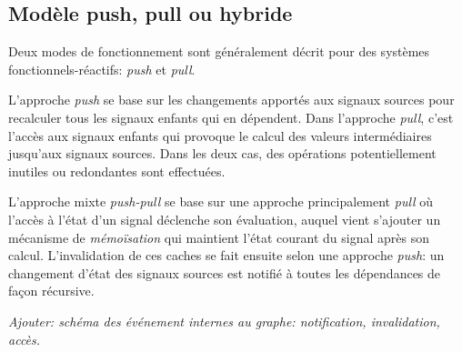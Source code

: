 \subsection{Modèle push, pull ou hybride}

Deux modes de fonctionnement sont généralement décrit pour des systèmes fonctionnels-réactifs: \emph{push} et \emph{pull}.

L'approche \emph{push} se base sur les changements apportés aux signaux sources pour recalculer tous les signaux enfants qui en dépendent. Dans l'approche \emph{pull}, c'est l'accès aux signaux enfants qui provoque le calcul des valeurs intermédiaires jusqu'aux signaux sources. Dans les deux cas, des opérations potentiellement inutiles ou redondantes sont effectuées.

L'approche mixte \emph{push-pull} se base sur une approche principalement \emph{pull} où l'accès à l'état d'un signal déclenche son évaluation, auquel vient s'ajouter un mécanisme de \emph{mémoïsation} qui maintient l'état courant du signal après son calcul. L'invalidation de ces caches se fait ensuite selon une approche \emph{push}: un changement d'état des signaux sources est notifié à toutes les dépendances de façon récursive.

\textit{Ajouter: schéma des événement internes au graphe: notification, invalidation, accès.}
